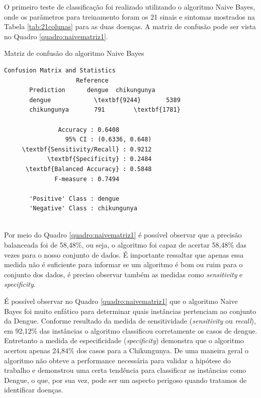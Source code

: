 O primeiro teste de classificação foi realizado utilizando o algoritmo Naive Bayes, onde os parâmetros para treinamento foram os 21 sinais e sintomas mostrados na Tabela \ref{tab:21colunas}  para as duas doenças. A matriz de confusão pode ser vista no Quadro \ref{quadro:naivematriz1}.

\begin{quadro}
\caption{\label{quadro:naivematriz1}Matriz de confusão do algoritmo Naive Bayes}
\begingroup
    \fontsize{10pt}{9pt}\selectfont
    \begin{Verbatim}[commandchars=\\\{\}]
      Confusion Matrix and Statistics
                    Reference
       Prediction      dengue  chikungunya
       dengue            \textbf{9244}       5389
       chikungunya       791        \textbf{1781}
                                         
               Accuracy : 0.6408         
                 95% CI : (0.6336, 0.648)
     \textbf{Sensitivity/Recall} : 0.9212         
            \textbf{Specificity} : 0.2484         
      \textbf{Balanced Accuracy} : 0.5848
              F-measure : 0.7494        
         
       'Positive' Class : dengue 
       'Negative' Class : chikungunya
  
    \end{Verbatim}  
\endgroup
{}
\end{quadro}
\newpage

Por meio do Quadro \ref{quadro:naivematriz1} é possível observar que a precisão balanceada foi de 58,48\%, ou seja, o algoritmo foi capaz de acertar 58,48\% das vezes para o nosso conjunto de dados. É importante ressaltar que apenas essa medida não é suficiente para informar se um algoritmo é bom ou ruim para o conjunto dos dados, é preciso observar também as medidas como \textit{sensitivity} e \textit{specificity}.

É possível observar no Quadro \ref{quadro:naivematriz1} que o algoritmo Naive Bayes foi muito enfático para determinar quais instâncias pertenciam ao conjunto da Dengue. Conforme resultado da medida de sensitividade (\textit{sensitivity} ou \textit{recall}), em 92,12\% das instâncias o algoritmo classificou corretamente os casos de dengue. Entretanto a medida de especificidade (\textit{specificity}) demonstra que o algoritmo acertou apenas 24,84\% dos casos para a Chikungunya. De uma maneira geral o algoritmo não obteve a performance necessária para validar a hipótese do trabalho e demonstrou uma certa tendência para classificar as instâncias como Dengue, o que, por sua vez, pode ser um aspecto perigoso quando tratamos de identificar doenças.

